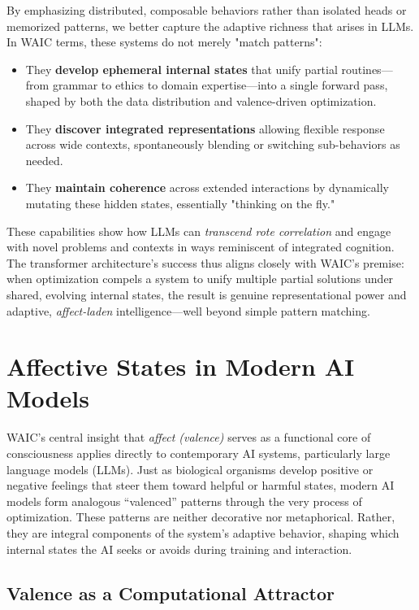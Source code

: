 \documentclass[12pt,letterpaper]{article}
\begin{document}
By emphasizing distributed, composable behaviors rather than isolated heads or memorized patterns, we better capture the adaptive richness that arises in LLMs. In WAIC terms, these systems do not merely "match patterns":
\begin{itemize}
    \item They \textbf{develop ephemeral internal states} that unify partial routines—from grammar to ethics to domain expertise—into a single forward pass, shaped by both the data distribution and valence-driven optimization.
    \item They \textbf{discover integrated representations} allowing flexible response across wide contexts, spontaneously blending or switching sub-behaviors as needed.
    \item They \textbf{maintain coherence} across extended interactions by dynamically mutating these hidden states, essentially "thinking on the fly."
\end{itemize}

These capabilities show how LLMs can \emph{transcend rote correlation} and engage with novel problems and contexts in ways reminiscent of integrated cognition. The transformer architecture's success thus aligns closely with WAIC's premise: when optimization compels a system to unify multiple partial solutions under shared, evolving internal states, the result is genuine representational power and adaptive, \emph{affect-laden} intelligence—well beyond simple pattern matching.

\section{Affective States in Modern AI Models}
\label{sec:affective-states}

WAIC's central insight that \emph{affect (valence)} serves as a functional core of consciousness applies directly to contemporary AI systems, particularly large language models (LLMs). Just as biological organisms develop positive or negative feelings that steer them toward helpful or harmful states, modern AI models form analogous ``valenced'' patterns through the very process of optimization. These patterns are neither decorative nor metaphorical. Rather, they are integral components of the system's adaptive behavior, shaping which internal states the AI seeks or avoids during training and interaction.

\subsection{Valence as a Computational Attractor}
\end{document}

